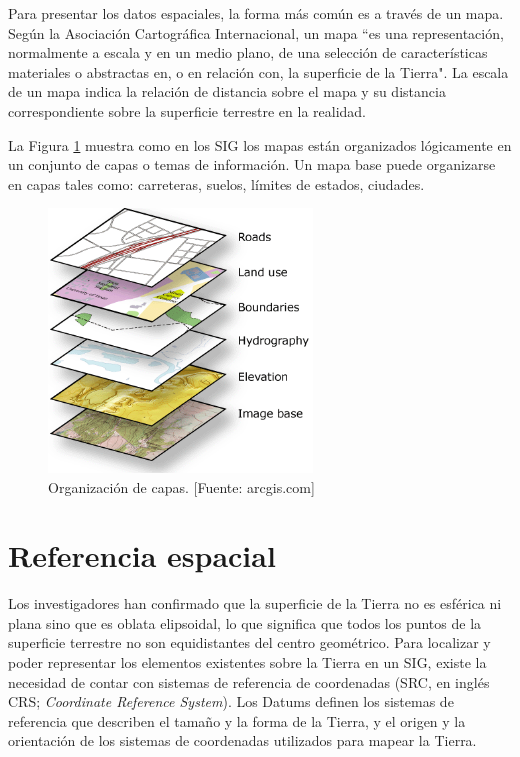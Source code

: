 Para presentar los datos espaciales, la forma más común es a través de un mapa. Según la Asociación Cartográfica Internacional, un mapa ``es una representación, normalmente a escala y en un medio plano, de una selección de características materiales o abstractas en, o en relación con, la superficie de la Tierra". La escala de un mapa indica la relación de distancia sobre el mapa y su distancia correspondiente sobre la superficie terrestre en la realidad.

La Figura \ref{fig:capasGis} muestra como en los SIG los mapas están organizados lógicamente en un conjunto de capas o temas de información. Un mapa base puede organizarse en capas tales como: carreteras, suelos, límites de estados, ciudades.

\begin{figure}[H]
    \centering
    \includegraphics[width=7cm]{capas_gis.png}
    \caption{Organización de capas. [Fuente: arcgis.com]}
    \label{fig:capasGis}
\end{figure}

\section{Referencia espacial}

Los investigadores han confirmado que la superficie de la Tierra no es esférica ni plana sino que es oblata elipsoidal, lo que significa que todos los puntos de la superficie terrestre no son equidistantes del centro geométrico. Para localizar y poder representar los elementos existentes sobre la Tierra en un SIG, existe la necesidad de contar con sistemas de referencia de coordenadas (SRC, en inglés CRS; \textit{Coordinate Reference System}). Los Datums definen los sistemas de referencia que describen el tamaño y la forma de la Tierra, y el origen y la orientación de los sistemas de coordenadas utilizados para mapear la Tierra.

